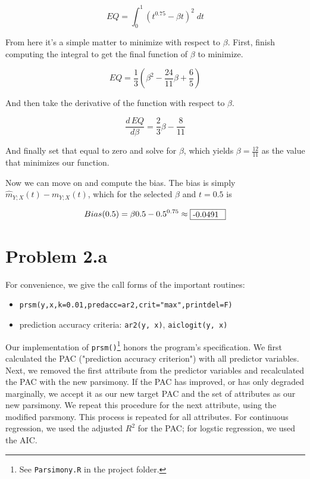 \documentclass[letter]{article}
\newcounter{foot}
\begin{document}
\begin{equation}
	EQ = \int _0 ^1 (t^{0.75} - \beta t)^2 \; dt
\end{equation}

From here it's a simple matter to minimize with respect to $\beta$. First, finish computing the integral to get the final function of $\beta$ to minimize.

\begin{equation}
	EQ = \frac{1}{3}(\beta^2 - \frac{24}{11}\beta + \frac{6}{5})
\end{equation}

And then take the derivative of the function with respect to $\beta$.

\begin{equation}
	\frac{d\,EQ}{d\beta} = \frac{2}{3}\beta - \frac{8}{11}
\end{equation}

And finally set that equal to zero and solve for $\beta$, which yields $\beta=\frac{12}{11}$ as the value that minimizes our function.

Now we can move on and compute the bias. The bias is simply $\hat{m}_{Y;X}(t) - m_{Y;X}(t)$, which for the selected $\beta$ and $t=0.5$ is

\begin{equation}
	Bias(0.5) = \beta 0.5 - 0.5^{0.75} \approx {\fbox {\parbox{0.5in}{-0.0491}}}
\end{equation}


\section*{Problem 2.a}

For convenience, we give the call forms of the important routines:
\begin{itemize}
  \item \texttt{prsm(y,x,k=0.01,predacc=ar2,crit="max",printdel=F)} 
  \item prediction accuracy criteria: \texttt{ar2(y, x)}, \texttt{aiclogit(y, x)}
\end{itemize}

Our implementation of \texttt{prsm()}\footnote{See \texttt{Parsimony.R} in the project folder.} 
honors the program's specification. We first calculated the PAC ("prediction accuracy criterion")
with all predictor variables. Next, we removed the first attribute from the predictor variables 
and recalculated the PAC with the new parsimony. If the PAC has improved, or has only degraded 
marginally, we accept it as our new target PAC and the set of attributes as our new parsimony.
We repeat this procedure for the next attribute, using the modified parsmony. This process is 
repeated for all attributes. For continuous regression, we used the adjusted $R^2$ for the PAC; 
for logstic regression, we used the AIC.
\end{document}

